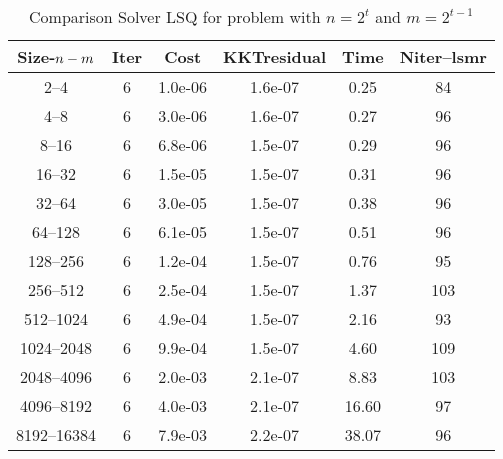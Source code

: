 \documentclass[letterpaper,12pt,oneside,final]{book}
\begin{document}
\begin{table}
\caption{ Comparison Solver LSQ  for  problem with $n=2^{t}$ and $m=2^{t-1}$  } 
\begin{center}
\begin{tabular}{|*{6}{c}|} \hline
Size-$n\--m$ & \multicolumn{1}{c}{Iter} & \multicolumn{1}{c}{Cost}& \multicolumn{1}{c}{KKTresidual} & \multicolumn{1}{c}{Time} & \multicolumn{1}{c|}{Niter--lsmr} \\ 
\hline

2--4           &6    &1.0e-06        &1.6e-07        &0.25           &84   \\4--8           &6    &3.0e-06        &1.6e-07        &0.27           &96   \\8--16          &6    &6.8e-06        &1.5e-07        &0.29           &96   \\16--32         &6    &1.5e-05        &1.5e-07        &0.31           &96   \\32--64         &6    &3.0e-05        &1.5e-07        &0.38           &96   \\64--128        &6    &6.1e-05        &1.5e-07        &0.51           &96   \\128--256       &6    &1.2e-04        &1.5e-07        &0.76           &95   \\256--512       &6    &2.5e-04        &1.5e-07        &1.37           &103  \\512--1024      &6    &4.9e-04        &1.5e-07        &2.16           &93   \\1024--2048     &6    &9.9e-04        &1.5e-07        &4.60           &109  \\2048--4096     &6    &2.0e-03        &2.1e-07        &8.83           &103  \\4096--8192     &6    &4.0e-03        &2.1e-07        &16.60          &97   \\8192--16384    &6    &7.9e-03        &2.2e-07        &38.07          &96   \\ 

\hline
\end{tabular}
\end{center}
\end{table}
\end{document}
